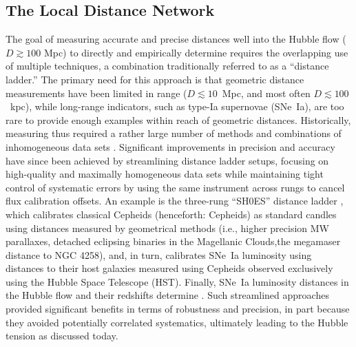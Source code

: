 \subsection{The Local Distance Network}\label{sec:dn_definition}

The goal of measuring accurate and precise distances well into the Hubble flow 
($D \gtrsim 100 $ Mpc) to directly and empirically determine {\Hcst} requires the overlapping use of multiple techniques, a combination traditionally referred to as a ``distance ladder.''  The primary need for this approach is that geometric distance measurements have been limited in range ($D \lesssim 10$~Mpc, and most often $D \lesssim 100$~kpc), while long-range indicators, such as type-Ia supernovae (SNe~Ia), are too rare to provide enough examples within reach of geometric distances. 
Historically, measuring {\Hcst} thus required a rather large number of methods and combinations of inhomogeneous data sets \citep[e.g.,][]{2001ApJ...553...47F,2006ApJ...653..843S}. Significant improvements in precision and accuracy have since been achieved by streamlining distance ladder setups, focusing on high-quality and maximally homogeneous data sets while maintaining tight control of systematic errors by using the same instrument across rungs to cancel flux calibration offsets.
An example is the three-rung ``SH0ES'' distance ladder \citet{2009ApJ...699..539R}, which calibrates classical Cepheids (henceforth: Cepheids) as standard candles using distances measured by geometrical methods (i.e., higher precision MW parallaxes, detached eclipsing binaries in the Magellanic Clouds,the megamaser distance to NGC 4258), and, in turn, calibrates SNe~Ia luminosity using distances to their host galaxies measured using Cepheids observed exclusively using the {Hubble} Space Telescope (HST). Finally, SNe~Ia luminosity distances in the Hubble flow and their redshifts determine {\Hcst} \citep[see Fig.~10 in][]{2016ApJ...826...56R}. Such streamlined approaches provided significant benefits in terms of robustness and precision, in part because they avoided potentially correlated systematics, ultimately leading to the Hubble tension as discussed today.

